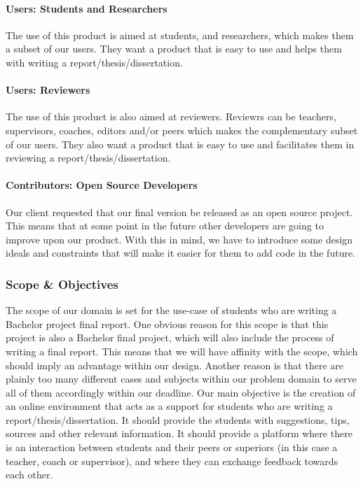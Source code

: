 \paragraph{Users: Students and Researchers} The use of this product is aimed at students, and researchers, which makes them a subset of our users. They want a product that is easy to use and helps them with writing a report/thesis/dissertation.

\paragraph{Users: Reviewers} The use of this product is also aimed at reviewers. Reviewrs can be teachers, supervisors, coaches, editors and/or peers which makes the complementary subset of our users. They also want a product that is easy to use and facilitates them in reviewing a report/thesis/dissertation.

\paragraph{Contributors: Open Source Developers} Our client requested that our final version be released as an open source project. This means that at some point in the future other developers are going to improve upon our product. With this in mind, we have to introduce some design ideals and constraints that will make it easier for them to add code in the future.

\subsubsection{Scope \& Objectives}

The scope of our domain is set for the use-case of students who are writing a Bachelor project final report. One obvious reason for this scope is that this project is also a Bachelor final project, which will also include the process of writing a final report. This means that we will have affinity with the scope, which should imply an advantage within our design. Another reason is that there are plainly too many different cases and subjects within our problem domain to serve all of them accordingly within our deadline.
Our main objective is the creation of an online environment that acts as a support for students who are writing a report/thesis/dissertation. It should provide the students with suggestions, tips, sources and other relevant information. It should provide a platform where there is an interaction between students and their peers or superiors (in this case a teacher, coach or supervisor), and where they can exchange feedback towards each other.

